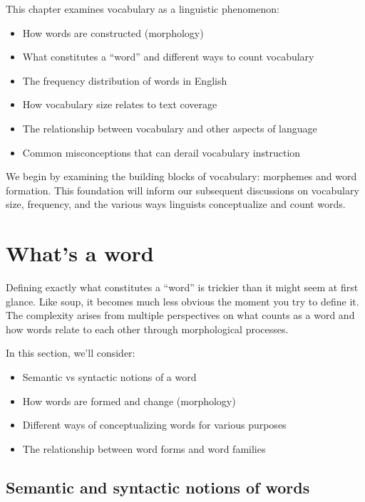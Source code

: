 This chapter examines vocabulary as a linguistic phenomenon:

\begin{itemize}[noitemsep]
\item How words are constructed (morphology)
\item What constitutes a \enquote{word} and different ways to count vocabulary
\item The frequency distribution of words in English
\item How vocabulary size relates to text coverage
\item The relationship between vocabulary and other aspects of language
\item Common misconceptions that can derail vocabulary instruction
\end{itemize}

We begin by examining the building blocks of vocabulary: morphemes and word formation. This foundation will inform our subsequent discussions on vocabulary size, frequency, and the various ways linguists conceptualize and count words.

\section{What's a word}\label{sec:what-is-a-word}

Defining exactly what constitutes a \enquote{word} is trickier than it might seem at first glance. Like soup, it becomes much less obvious the moment you try to define it. The complexity arises from multiple perspectives on what counts as a word and how words relate to each other through morphological processes.

In this section, we'll consider:

\begin{itemize}[noitemsep]
   \item Semantic vs syntactic notions of a word
   \item How words are formed and change (morphology)
   \item Different ways of conceptualizing words for various purposes
   \item The relationship between word forms and word families
\end{itemize}

\subsection{Semantic and syntactic notions of words}

